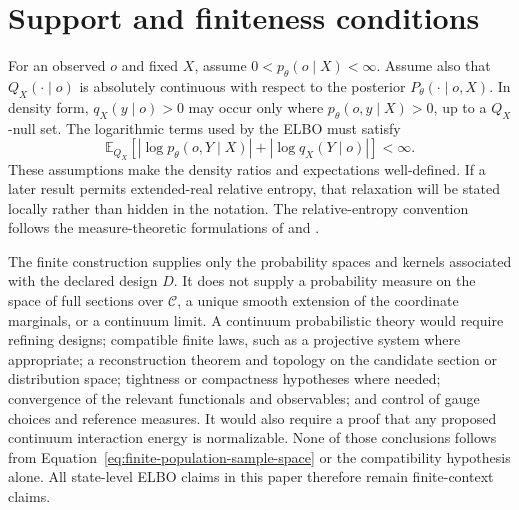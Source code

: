 \section{Support and finiteness conditions}

For an observed \(o\) and fixed \(X\), assume \(0<p_\theta(o\mid X)<\infty\). Assume also that \(Q_X(\mathord\cdot\mid o)\) is absolutely continuous with respect to the posterior \(P_\theta(\mathord\cdot\mid o,X)\). In density form, \(q_X(y\mid o)>0\) may occur only where \(p_\theta(o,y\mid X)>0\), up to a \(Q_X\)-null set. The logarithmic terms used by the ELBO must satisfy
\begin{equation}
\mathbb E_{Q_X}
\left[
\left|\log p_\theta(o,Y\mid X)\right|
+\left|\log q_X(Y\mid o)\right|
\right]<\infty.
\label{eq:elbo-integrability-condition}
\end{equation}
These assumptions make the density ratios and expectations well-defined. If a later result permits extended-real relative entropy, that relaxation will be stated locally rather than hidden in the notation. The relative-entropy convention follows the measure-theoretic formulations of \citet{Kullback1951} and \citet{Csiszar1967}.

The finite construction supplies only the probability spaces and kernels associated with the declared design \(D\). It does not supply a probability measure on the space of full sections over \(\mathcal C\), a unique smooth extension of the coordinate marginals, or a continuum limit. A continuum probabilistic theory would require refining designs; compatible finite laws, such as a projective system where appropriate; a reconstruction theorem and topology on the candidate section or distribution space; tightness or compactness hypotheses where needed; convergence of the relevant functionals and observables; and control of gauge choices and reference measures. It would also require a proof that any proposed continuum interaction energy is normalizable. None of those conclusions follows from Equation~\eqref{eq:finite-population-sample-space} or the compatibility hypothesis alone. All state-level ELBO claims in this paper therefore remain finite-context claims.
